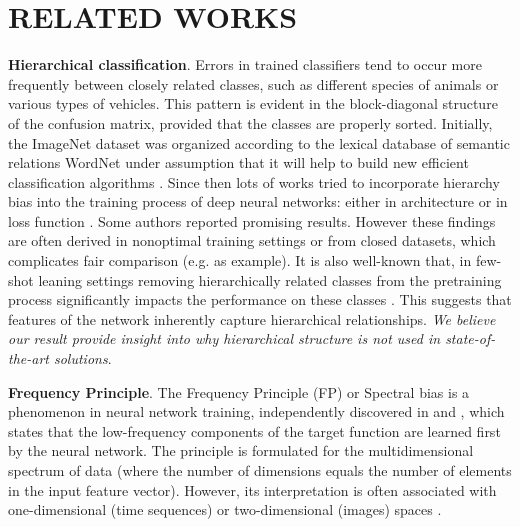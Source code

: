 \section{RELATED WORKS}
\textbf{Hierarchical classification}. Errors in trained classifiers tend to occur
more frequently between closely related classes, such as different species of
animals or various types of vehicles. This pattern is evident in the
block-diagonal structure of the confusion matrix, provided that the classes are
properly sorted. Initially, the ImageNet dataset was organized according to the
lexical database of semantic relations WordNet \citep{fellbaum2010wordnet} under
assumption that it will help to build new efficient classification algorithms
\citep{russakovsky2015imagenet}. Since then lots of works tried to incorporate
hierarchy bias into the training process of deep neural networks: either in
architecture \citep{hinton2015distilling, Malashin2016, xiao2014error} or in
loss function \citep{redmon2017yolo9000, brust2019integrating}. Some authors
reported promising results. However these findings are often derived in
nonoptimal training settings \citep{brust2019integrating} or from closed
datasets, which complicates fair comparison (e.g. \citep{hinton2015distilling}
as example). It is also well-known that, in few-shot leaning settings removing
hierarchically related classes from the pretraining process significantly
impacts the performance on these classes \citep{vinyals2016matching}. This
suggests that features of the network inherently capture hierarchical
relationships. \textit{We believe our result provide insight into why
  hierarchical structure is not used in state-of-the-art solutions}.

\textbf{Frequency Principle}. The Frequency Principle (FP) or Spectral bias is a
phenomenon in neural network training, independently discovered in
\citep{rahaman2019spectral} and \citep{xu2019frequency}, which states that the
low-frequency components of the target function are learned first by the neural
network. The principle is formulated for the multidimensional spectrum of data
(where the number of dimensions equals the number of elements in the input
feature vector). However, its interpretation is often associated with
one-dimensional (time sequences) or two-dimensional (images) spaces
\citep{xu2024overview}.

